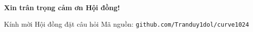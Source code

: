 \begin{frame}
  \centering
  \vspace{1.5em}
  {\Large\bfseries Xin trân trọng cảm ơn Hội đồng!}
  \vspace{1.5em}

  \begin{block}{\centering Kính mời Hội đồng đặt câu hỏi}
    \centering
    \vspace{0.3em}
    Mã nguồn: \texttt{github.com/Tranduy1dol/curve1024}\\[4pt]
    \vspace{0.3em}
  \end{block}
\end{frame}
